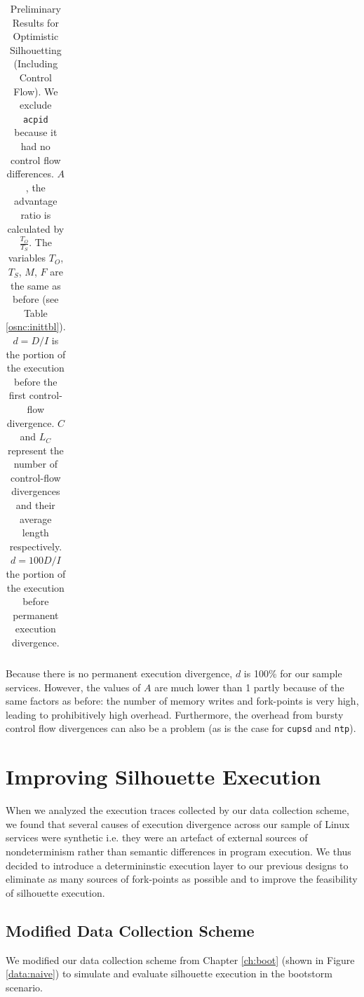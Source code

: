 \begin{table} [h]
\begin{adjustwidth}{-1cm}{}
\begin{tabular}{|l||c|c||c||c|c|c|c|c||c||c|}
  \end{tabular}
\end{adjustwidth}

\caption{Preliminary Results for Optimistic Silhouetting (Including Control Flow). \newline 
  We exclude \texttt{acpid} because it had no control flow differences.
  $A$, the advantage ratio is calculated by $\frac{T_O}{T_S}$.
  The variables $T_O$, $T_S$, $M$, $F$ are the same as before (see Table \ref{osnc:inittbl}). 
  $d = D/I$ is the portion of the execution before the first control-flow divergence. 
  $C$ and $L_C$ represent the number of control-flow divergences and their average length
  respectively.  $d = 100D/I$  the portion of the execution before permanent execution divergence. }
\label{osc:inittbl}

\end{table}

\noindent Because there is no permanent execution divergence, $d$ is 100\%
for our sample services. However, the values of $A$ are much lower than 1
partly because of the same factors as before: the number
of memory writes and fork-points is very high,
leading to prohibitively high overhead. Furthermore,
the overhead from bursty control flow divergences 
can also be a problem (as is the case for \texttt{cupsd} and
\texttt{ntp}).

\newpage
\section{Improving Silhouette Execution} \label{silimprove}
When we analyzed the execution
traces collected by our data collection scheme,
we found that several causes of execution
divergence across our sample
of Linux services were synthetic i.e. they were an artefact
of external sources of nondeterminism
rather than semantic differences in program execution.
We thus decided to introduce a determininstic
execution layer to our previous
designs to eliminate as many sources of 
fork-points as possible and to 
improve the feasibility
of silhouette execution.

\subsection{Modified Data Collection Scheme}
We modified our data collection scheme from Chapter \ref{ch:boot} 
(shown in Figure \ref{data:naive}) to simulate and
evaluate silhouette execution in the bootstorm scenario.

